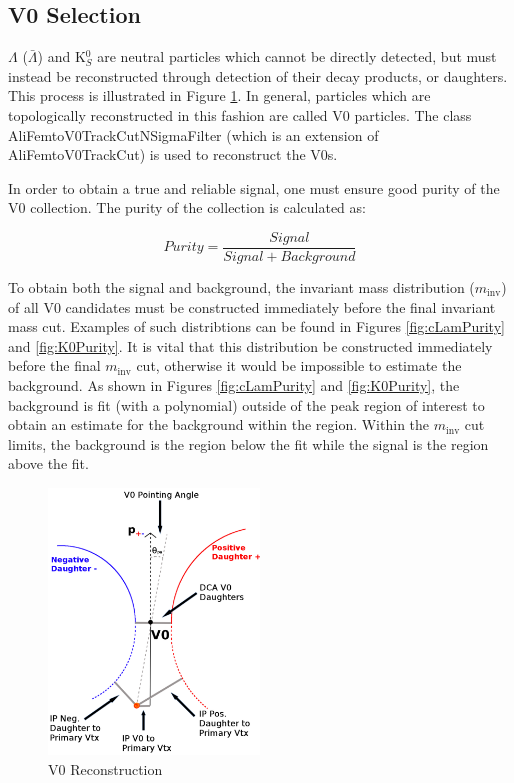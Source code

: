 \documentclass[../AnalysisNoteJBuxton.tex]{subfiles}
\begin{document}
\subsection{V0 Selection}
\label{V0Selection}

$\Lambda$ ($\bar{\Lambda}$) and K$^{0}_{S}$ are neutral particles which cannot be directly detected, but must instead be reconstructed through detection of their decay products, or daughters.  
This process is illustrated in Figure \ref{fig:V0Reconstruction}.
In general, particles which are topologically reconstructed in this fashion are called V0 particles.
The class AliFemtoV0TrackCutNSigmaFilter (which is an extension of AliFemtoV0TrackCut) is used to reconstruct the V0s.

In order to obtain a true and reliable signal, one must ensure good purity of the V0 collection.  The purity of the collection is calculated as:

\begin{equation}
 Purity = \frac{Signal}{Signal + Background}
\label{eqn:Purity}
\end{equation}

To obtain both the signal and background, the invariant mass distribution ($m_{\mathrm{inv}}$) of all V0 candidates must be constructed immediately before the final invariant mass cut.
Examples of such distribtions can be found in Figures \ref{fig:cLamPurity} and \ref{fig:K0Purity}.
It is vital that this distribution be constructed immediately before the final $m_{\mathrm{inv}}$ cut, otherwise it would be impossible to estimate the background.
As shown in Figures \ref{fig:cLamPurity} and \ref{fig:K0Purity}, the background is fit (with a polynomial) outside of the peak region of interest to obtain an estimate for the background within the region.
Within the $m_{\mathrm{inv}}$ cut limits, the background is the region below the fit while the signal is the region above the fit.

\begin{figure}[h]
  \centering
  \includegraphics[width=0.5\textwidth]{3_DataSelection/Figures/V0CutsGeneral.pdf}
  \caption[V0 Reconstruction]{V0 Reconstruction}
  \label{fig:V0Reconstruction}
\end{figure}




\end{document}
